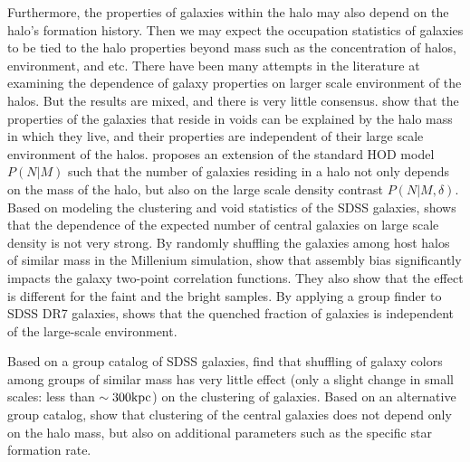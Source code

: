 \documentclass[12pt, preprint]{aastex}
\begin{document}
Furthermore, the properties of galaxies within the halo may also depend on the halo's formation history. Then we may expect the occupation statistics of galaxies to be tied to the halo properties beyond mass such as the concentration of halos, environment, and etc. There have been many attempts in the literature at examining the dependence of galaxy properties on larger scale environment of the halos. But the results are mixed, and there is very little consensus. \citet{tinker_void_2009} show that the properties of the galaxies that reside in voids can be explained by the halo mass in which they live, and their properties are independent of their large scale environment of the halos. \citet{tinker_density_hod} proposes an extension of the standard HOD model $P(N|M)$ such that the number of galaxies residing in a halo not only depends on the mass of the halo, but also on the large scale density contrast $P(N|M,\delta)$. Based on modeling the clustering and void statistics of the SDSS galaxies, \citet{edHOD-tinker} shows that the dependence of the expected number of central galaxies on large scale density is not very strong.    
By randomly shuffling the galaxies among host halos of similar mass in the Millenium simulation, \citet{croton2007} show that assembly bias significantly impacts the galaxy two-point correlation functions. They also show that the effect is different for the faint and the bright samples. By applying a group finder to SDSS DR7 galaxies, \citet{tinker2011} shows that the quenched fraction of galaxies is independent of the large-scale environment. 

Based on a group catalog of SDSS galaxies, \citet{blanton_group_2007} find that shuffling of galaxy colors among groups of similar mass has very little effect (only a slight change in small scales: less than $\sim 300 \rm{kpc}$) on the clustering of galaxies. Based on an alternative group catalog, \citet{wang2013} show that clustering of the central galaxies does not depend only on the halo mass, but also on additional parameters such as the specific star formation rate.
\end{document}
